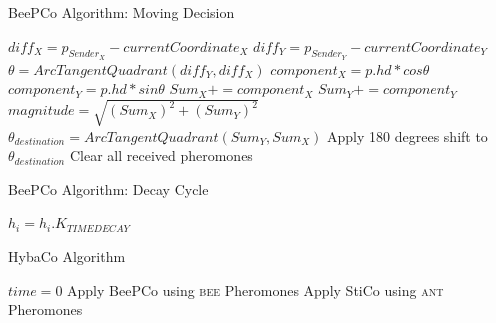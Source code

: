 \begin{algorithm}
  \caption{BeePCo Algorithm\cite{Caliskanelli2015}: Moving Decision}
  \label{desSysPseuBeeMovDec}
  \begin{algorithmic}[1]
        \State $ diff_{X} = p_{Sender_{X} } - currentCoordinate_{X} $
        \State $ diff_{Y} = p_{Sender_{Y} } - currentCoordinate_{Y} $
        \State $ \theta = ArcTangentQuadrant(diff_{Y}, diff_{X} ) $
        \State $ component_{X} = p.hd * cos\theta $
        \State $ component_{Y} = p.hd * sin\theta $
        \State $ Sum_{X} += component_{X} $
        \State $ Sum_{Y} += component_{Y} $
      \EndFor
    \EndIf
    \State $ magnitude = \sqrt{ (Sum_{X} )^{2} + (Sum_{Y} )^{2} } $
    \State $ \theta_{destination} = ArcTangentQuadrant(Sum_{Y},Sum_{X} ) $
    \State Apply 180 degrees shift to $ \theta_{destination} $
    \State Clear all received pheromones
  \end{algorithmic}
\end{algorithm}

\begin{algorithm}
  \caption{BeePCo Algorithm\cite{Caliskanelli2015}: Decay Cycle}
  \label{desSysPseuBeeDecay}
  \begin{algorithmic}[1]
      \State $ h_{i} = h_{i}.K_{TIMEDECAY} $
    \EndFor
  \end{algorithmic}
\end{algorithm}

\begin{algorithm}
  \caption{HybaCo Algorithm\cite{Broecker2015Demo} }
  \label{desSysPseuHybaCo}
  \begin{algorithmic}[1]
    \State $ time = 0 $
    \Loop
        \State Apply BeePCo using \textsc{bee} Pheromones
      \Else
        \State Apply StiCo using  \textsc{ant} Pheromones
      \EndIf
    \EndLoop
  \end{algorithmic}
\end{algorithm}

\clearpage

